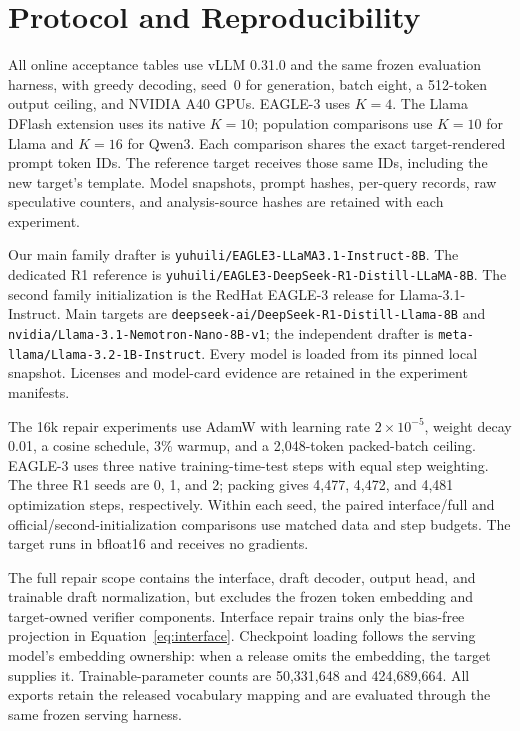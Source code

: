 \section{Protocol and Reproducibility}
\label{app:protocol}
All online acceptance tables use vLLM 0.31.0 and the same frozen evaluation harness, with greedy decoding, seed~0 for generation, batch eight, a 512-token output ceiling, and NVIDIA A40 GPUs. EAGLE-3 uses $K=4$. The Llama DFlash extension uses its native $K=10$; population comparisons use $K=10$ for Llama and $K=16$ for Qwen3. Each comparison shares the exact target-rendered prompt token IDs. The reference target receives those same IDs, including the new target's template. Model snapshots, prompt hashes, per-query records, raw speculative counters, and analysis-source hashes are retained with each experiment.

Our main family drafter is \nolinkurl{yuhuili/EAGLE3-LLaMA3.1-Instruct-8B}. The dedicated R1 reference is \nolinkurl{yuhuili/EAGLE3-DeepSeek-R1-Distill-LLaMA-8B}. The second family initialization is the RedHat EAGLE-3 release for Llama-3.1-Instruct. Main targets are \nolinkurl{deepseek-ai/DeepSeek-R1-Distill-Llama-8B} and \nolinkurl{nvidia/Llama-3.1-Nemotron-Nano-8B-v1}; the independent drafter is \nolinkurl{meta-llama/Llama-3.2-1B-Instruct}. Every model is loaded from its pinned local snapshot. Licenses and model-card evidence are retained in the experiment manifests.

The 16k repair experiments use AdamW with learning rate $2\times10^{-5}$, weight decay 0.01, a cosine schedule, 3\% warmup, and a 2,048-token packed-batch ceiling. EAGLE-3 uses three native training-time-test steps with equal step weighting. The three R1 seeds are 0, 1, and 2; packing gives 4,477, 4,472, and 4,481 optimization steps, respectively. Within each seed, the paired interface/full and official/second-initialization comparisons use matched data and step budgets. The target runs in bfloat16 and receives no gradients.

The full repair scope contains the interface, draft decoder, output head, and trainable draft normalization, but excludes the frozen token embedding and target-owned verifier components. Interface repair trains only the bias-free projection in Equation~\ref{eq:interface}. Checkpoint loading follows the serving model's embedding ownership: when a release omits the embedding, the target supplies it. Trainable-parameter counts are 50,331,648 and 424,689,664. All exports retain the released vocabulary mapping and are evaluated through the same frozen serving harness.

